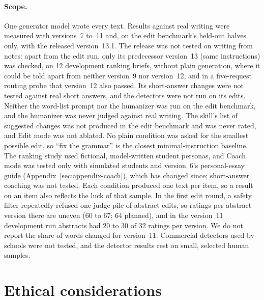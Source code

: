 \documentclass[11pt]{article}
\newcommand{\shipver}{13.1}
\begin{document}
\paragraph{Scope.} One generator model wrote every text. Results against real writing were measured with versions~7 to~11 and, on the edit benchmark's held-out halves only, with the released version~\shipver{}. The release was not tested on writing from notes: apart from the edit run, only its predecessor version~13 (same instructions) was checked, on 12 development ranking briefs, without plain generation, where it could be told apart from neither version~9 nor version~12, and in a five-request routing probe that version~12 also passed. Its short-answer changes were not tested against real short answers, and the detectors were not run on its edits. Neither the word-list prompt nor the humanizer was run on the edit benchmark, and the humanizer was never judged against real writing. The skill's list of suggested changes was not produced in the edit benchmark and was never rated, and Edit mode was not ablated. No plain condition was asked for the smallest possible edit, so ``fix the grammar'' is the closest minimal-instruction baseline. The ranking study used fictional, model-written student personas, and Coach mode was tested only with simulated students and version~6's personal-essay guide (Appendix~\ref{sec:appendix-coach}), which has changed since; short-answer coaching was not tested. Each condition produced one text per item, so a result on an item also reflects the luck of that sample. In the first edit round, a safety filter repeatedly refused one judge pile of abstract edits, so ratings per abstract version there are uneven (60 to 67; 64 planned), and in the version~11 development run abstracts had 20 to 30 of 32 ratings per version. We do not report the share of words changed for version~11. Commercial detectors used by schools were not tested, and the detector results rest on small, selected human samples.

\section*{Ethical considerations}
\end{document}
